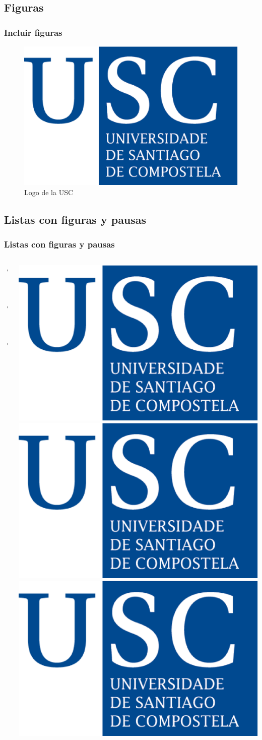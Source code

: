 \documentclass{beamer}
\begin{document}
\subsection{Figuras} 
\begin{frame}
\frametitle{Incluir figuras}
\begin{figure}
\includegraphics[scale=0.3]{../figuras/logo_usc.eps} 
\caption{Logo de la USC}
\end{figure}
\end{frame}

\subsection{Listas con figuras y pausas} 

\begin{frame}
\frametitle{Listas con figuras y pausas}
\begin{columns}
\begin{column}{4cm}
\begin{itemize}
\item<1-> Una
\item<3-> Dos
\item<5-> Tres
\end{itemize}
\vspace{3cm} 
\end{column}
\begin{column}{4cm}
\begin{overprint}
\includegraphics<2>[scale=0.05]{../figuras/logo_usc.eps}
\includegraphics<4>[scale=0.10]{../figuras/logo_usc.eps}
\includegraphics<6>[scale=0.15]{../figuras/logo_usc.eps}
\end{overprint}
\end{column}
\end{columns}
\end{frame}
\end{document}
